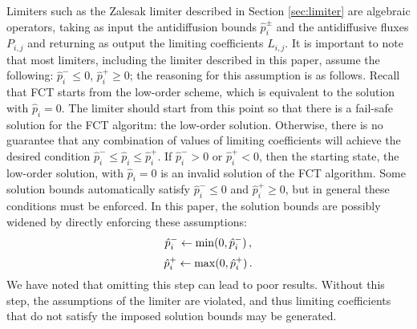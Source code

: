Limiters such as the Zalesak limiter described in Section \ref{sec:limiter} are algebraic
operators, taking as input the antidiffusion bounds
$\hat{p}_i^\pm$ and the antidiffusive fluxes $P_{i,j}$ and returning as output the
limiting coefficients $L_{i,j}$. It is important to note that most limiters,
including the limiter described in this paper, assume the following:
$\hat{p}_i^-\leq 0$, $\hat{p}_i^+\geq 0$; the reasoning for this assumption
is as follows. Recall that FCT starts from the
low-order scheme, which is equivalent to the solution with $\hat{p}_i=0$.
The limiter should start from this point so that there is a fail-safe solution
for the FCT algoritm: the low-order solution. Otherwise, there is no guarantee
that any combination of values of limiting coefficients will achieve
the desired condition $\hat{p}_i^-\leq \hat{p}_i\leq \hat{p}_i^+$. If
$\hat{p}_i^- > 0$ or $\hat{p}_i^+ < 0$, then the starting state, the low-order
solution, with $\hat{p}_i=0$ is an invalid solution of the FCT algorithm.
Some solution bounds automatically satisfy $\hat{p}_i^-\leq 0$ and $\hat{p}_i^+\geq 0$,
but in general these conditions must be enforced. In this paper, the solution
bounds are possibly widened by directly enforcing these assumptions:
\begin{equation}
  \hat{p}_i^- \gets \min(0,\hat{p}_i^-) \,,
\end{equation}
\begin{equation}
  \hat{p}_i^+ \gets \max(0,\hat{p}_i^+) \,.
\end{equation}
We have noted that omitting this step can lead to poor results. Without this step,
the assumptions of the
limiter are violated, and thus limiting coefficients that do not satisfy the
imposed solution bounds may be generated.


